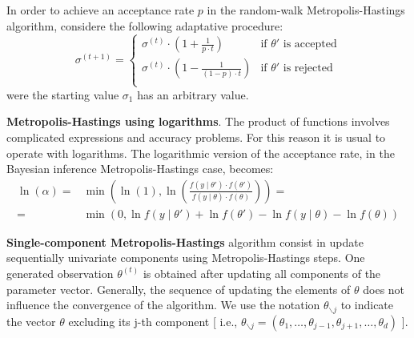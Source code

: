 \documentclass[11pt,fleqn]{book} %
\begin{document}
\begin{proposition}
	In order to achieve an acceptance rate $p$ in the random-walk 
	Metropolis-Hastings algorithm, considere the following adaptative
	procedure:
	\begin{displaymath}
		\sigma^{(t+1)} = \left\{
		\begin{array}{ll}
			\sigma^{(t)} \cdot \left( 1 + \frac{1}{p \cdot t} \right) & \text{if $\theta'$ is accepted} \\
			\sigma^{(t)} \cdot \left( 1 - \frac{1}{(1-p) \cdot t} \right) & \text{if $\theta'$ is rejected} \\
		\end{array}
		\right.
	\end{displaymath}
	were the starting value $\sigma_1$ has an arbitrary value.
\end{proposition}

\textbf{Metropolis-Hastings using logarithms}.
The product of functions involves complicated expressions and accuracy 
problems. For this reason it is usual to operate with logarithms. The 
logarithmic version of the acceptance rate, in the Bayesian inference 
Metropolis-Hastings case, becomes:
\begin{displaymath}
	\begin{array}{rl}
		\ln(\alpha) = & \min \left( \ln(1),  
		\ln \left(\frac{f(y \mid \theta') \cdot f(\theta')}{f(y \mid \theta) \cdot f(\theta)}\right)
		\right) = \\
		= & \min \left( 0,
		\ln f(y \mid \theta') + \ln f(\theta') - \ln f(y \mid \theta) - \ln f(\theta)
		\right)
	\end{array}
\end{displaymath}

\textbf{Single-component Metropolis-Hastings} algorithm consist in update 
sequentially univariate components using Metropolis-Hastings steps. 
One generated observation $\theta^{(t)}$ is obtained after updating all 
components of the parameter vector. Generally, the sequence of updating the 
elements of $\theta$ does not influence the convergence of the algorithm.
We use the notation $\theta_{\backslash j}$ to indicate the vector $\theta$ 
excluding its j-th component [ i.e., $\theta_{\backslash j} = 
(\theta_1,\dots,\theta_{j-1},\theta_{j+1},\dots,\theta_{d})$ ].
\end{document}
